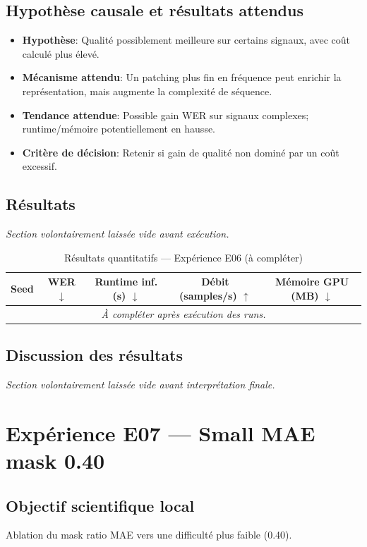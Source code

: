 \documentclass[11pt,a4paper]{article}
\begin{document}
\subsection{Hypothèse causale et résultats attendus}
\begin{itemize}[leftmargin=1.2cm]
\item \textbf{Hypothèse}: Qualité possiblement meilleure sur certains signaux, avec coût calculé plus élevé.
\item \textbf{Mécanisme attendu}: Un patching plus fin en fréquence peut enrichir la représentation, mais augmente la complexité de séquence.
\item \textbf{Tendance attendue}: Possible gain WER sur signaux complexes; runtime/mémoire potentiellement en hausse.
\item \textbf{Critère de décision}: Retenir si gain de qualité non dominé par un coût excessif.
\end{itemize}

\subsection{Résultats}
\textit{Section volontairement laissée vide avant exécution.}

\begin{table}[H]
\centering
\caption{Résultats quantitatifs --- Expérience E06 (à compléter)}
\begin{tabular}{lcccc}
\toprule
Seed & WER $\downarrow$ & Runtime inf. (s) $\downarrow$ & Débit (samples/s) $\uparrow$ & Mémoire GPU (MB) $\downarrow$ \\
\midrule
\multicolumn{5}{c}{\textit{À compléter après exécution des runs.}} \\
\bottomrule
\end{tabular}
\end{table}

\subsection{Discussion des résultats}
\textit{Section volontairement laissée vide avant interprétation finale.}


\section{Expérience E07 --- Small MAE mask 0.40}
\subsection{Objectif scientifique local}
Ablation du mask ratio MAE vers une difficulté plus faible (0.40).
\end{document}
